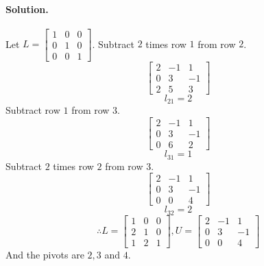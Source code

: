 \paragraph*{Solution.}
Let $L = \begin{bmatrix}
    1&0&0\\0&1&0\\0&0&1
\end{bmatrix}$.
Subtract $2$ times row $1$ from row $2$.
$$\begin{bmatrix}
    2&-1&1\\0&3&-1\\2&5&3
\end{bmatrix}$$
$$l_{21} = 2$$
Subtract row $1$ from row $3$.
$$\begin{bmatrix}
    2&-1&1\\0&3&-1\\0&6&2
\end{bmatrix}$$
$$l_{31} = 1$$
Subtract $2$ times row $2$ from row $3$.
$$\begin{bmatrix}
    2&-1&1\\0&3&-1\\0&0&4
\end{bmatrix}$$
$$l_{32} = 2$$
$$\therefore L = \begin{bmatrix}
    1&0&0\\2&1&0\\1&2&1
\end{bmatrix}, U = \begin{bmatrix}
    2&-1&1\\0&3&-1\\0&0&4
\end{bmatrix}$$
And the pivots are $2, 3$ and $4$.

